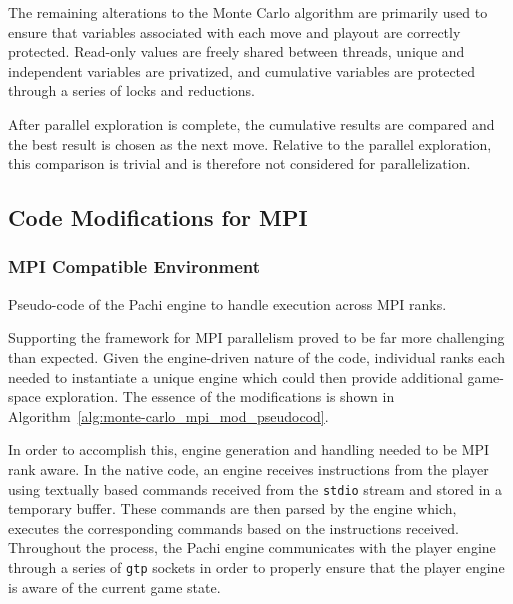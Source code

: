 \documentclass[nocopyrightspace, 10pt]{sigplanconf}
\begin{document}
The remaining alterations to the Monte Carlo algorithm are primarily used to ensure that variables associated with each move and playout are correctly protected.  Read-only values are freely shared between threads, unique and independent variables are privatized, and cumulative variables are protected through a series of locks and reductions.  

After parallel exploration is complete, the cumulative results are compared and the best result is chosen as the next move.  Relative to the parallel exploration, this comparison is trivial and is therefore not considered for parallelization.
	
\subsection{Code Modifications for MPI}
\subsubsection{MPI Compatible Environment}


\begin{algorithm}
 \caption{Pseudo-code of the Pachi engine to handle execution across MPI ranks.}
 \label{alg:monte-carlo_mpi_mod_pseudocod}
\end{algorithm}



Supporting the framework for MPI parallelism proved to be far more challenging than expected.  Given the engine-driven nature of the code, individual ranks each needed to instantiate a unique engine which could then provide additional game-space exploration.  The essence of the modifications is shown in Algorithm~\ref{alg:monte-carlo_mpi_mod_pseudocod}.

In order to accomplish this, engine generation and handling needed to be MPI rank aware.  In the native code, an engine receives instructions from the player using textually based commands received from the \texttt{stdio} stream and stored in a temporary buffer.  These commands are then parsed by the engine which, executes the corresponding commands based on the instructions received.  Throughout the process, the Pachi engine communicates with the player engine through a series of \texttt{gtp} sockets in order to properly ensure that the player engine is aware of the current game state.
\end{document}
